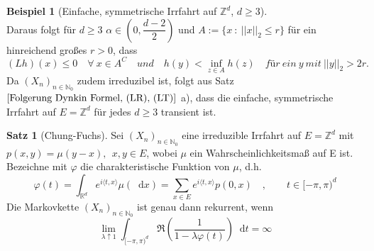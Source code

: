 \documentclass[a4paper,12pt]{scrartcl}
\theoremstyle{definition}
\newtheorem{sat}{Satz}[section]
\newtheorem{bsp}{Beispiel}[section]
\newcommand*\diff{\mathop{}\!\mathrm{d}}
\begin{document}
\begin{bsp}[Einfache, symmetrische Irrfahrt auf $\mathbb{Z}^{d}$, $d \geq 3$]
\begin{equation*}
\end{equation*}
Daraus folgt für $d \geq 3$ $\alpha \in \left(0,\dfrac{d-2}{2}\right)$ und $A := \lbrace x \: : \: {\vert \vert x \vert \vert}_{2} \leq r \rbrace$ für ein hinreichend großes $r>0$, dass
\begin{equation*}
(Lh)(x) \leq 0 \quad \forall \: x \in A^{C} \quad und \quad h(y) < \inf_{z \in A} h(z) \quad für \: ein \: y \: mit \: {\vert \vert y \vert \vert}_{2} > 2r.
\end{equation*}
Da $(X_{n})_{n \in \mathbb{N}_{0}}$ zudem irreduzibel ist, folgt aus Satz $\ref{Folgerung Dynkin Formel, (LR), (LT)}$ a), dass die einfache, symmetrische Irrfahrt auf $E = \mathbb{Z}^{d}$ für jedes $d \geq 3$ transient ist.
\end{bsp}
\begin{sat}[Chung-Fuchs]
\label{Chung-Fuchs}
Sei $(X_{n})_{n \in \mathbb{N}_{0}}$ eine irreduzible Irrfahrt auf $E = \mathbb{Z}^{d}$ mit $p(x,y) = \mu (y-x), \: \: x,y \in E$, wobei $\mu$ ein Wahrscheinlichkeitsmaß auf E ist. Bezeichne mit $\varphi$ die charakteristische Funktion von $\mu$, d.h.
\begin{equation*}
\varphi(t) = \int_{\mathbb{R}^{d}} e^{i \langle t,x \rangle} \mu (\diff x ) = \sum_{x \in E} e^{i \langle t,x \rangle} p(0,x) \quad , \qquad t \in [-\pi, \pi)^{d}
\end{equation*}
Die Markovkette $(X_{n})_{n \in \mathbb{N}_{0}}$ ist genau dann rekurrent, wenn
\begin{equation*}
\lim_{\lambda \uparrow 1} \int_{[-\pi, \pi)^{d}} \Re (\dfrac{1}{1-\lambda \varphi(t)}) \diff t  = \infty
\end{equation*}
\end{sat}
\end{document}
